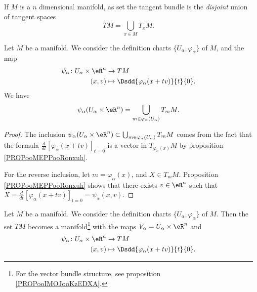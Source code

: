 If $M$ is a $n$ dimensional manifold, as set the tangent bundle is the \emph{disjoint} union of tangent spaces
\begin{equation}
	TM=\bigcup_{x\in M}T_xM.
\end{equation}


\begin{lemma}	\label{LEMooLZVTooSvHmjn}
	Let \( M\) be a manifold. We consider the definition charts \( \{ U_{\alpha}, \varphi_{\alpha} \}\) of \( M\), and the map
	\begin{equation}
		\begin{aligned}
			\psi_{\alpha}\colon U_{\alpha}\times \eR^n & \to TM                                         \\
			(x,v)                                      & \mapsto \Dsdd{ \varphi_{\alpha}(x+tv) }{t}{0}.
		\end{aligned}
	\end{equation}
	We have
	\begin{equation}
		\psi_{\alpha}(U_{\alpha}\times \eR^n)=\bigcup_{m\in\varphi_{\alpha}(U_{\alpha})}T_mM.
	\end{equation}
\end{lemma}

\begin{proof}
	The inclusion \( \psi_{\alpha}(U_{\alpha}\times \eR^n)\subset\bigcup_{m\in\varphi_{\alpha}(U_{\alpha})}T_mM\) comes from the fact that the formula \( \frac{d}{dt} \left[ \varphi_{\alpha}(x+tv)  \right]_{t=0}\) is a vector in \( T_{\varphi_{\alpha}(x)}M\) by proposition \ref{PROPooMEPPooRonxuh}.

	For the reverse inclusion, let \( m=\varphi_{\alpha}(x)\), and \( X\in T_mM\). Proposition \ref{PROPooMEPPooRonxuh} shows that there exists \( v\in \eR^n\) such that \( X=\frac{d}{dt} \left[ \varphi_{\alpha}(x+tv)  \right]_{t=0}=\psi_{\alpha}(x,v)\).
\end{proof}


\begin{theorem}     \label{THOooTSQXooLvJMQb}
	Let \( M\) be a manifold. We consider the definition charts \( \{ U_{\alpha}, \varphi_{\alpha} \}\) of \( M\). Then the set \( TM\) becomes a manifold\footnote{For the vector bundle structure, see proposition \ref{PROPooIMOJooKzEDXA}.} with the maps \( V_{\alpha}=U_{\alpha}\times \eR^n\) and
	\begin{equation}
		\begin{aligned}
			\psi_{\alpha}\colon U_{\alpha}\times \eR^n & \to TM                                         \\
			(x,v)                                      & \mapsto \Dsdd{ \varphi_{\alpha}(x+tv) }{t}{0}.
		\end{aligned}
	\end{equation}
\end{theorem}

